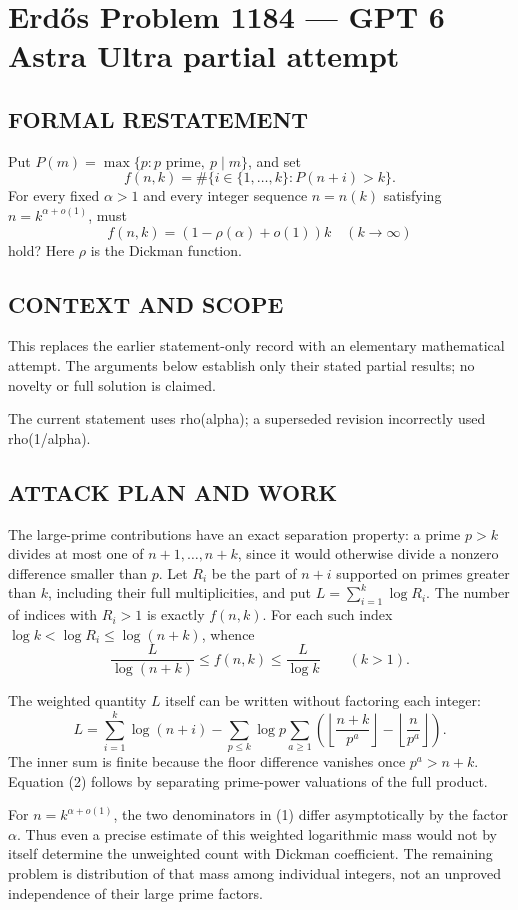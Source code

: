 \section*{Erd\H{o}s Problem 1184 --- GPT 6 Astra Ultra partial attempt}


\subsection*{FORMAL RESTATEMENT}
Put $P(m)=\max\{p:p\text{ prime},\ p\mid m\}$, and set
\[f(n,k)=\#\{i\in\{1,\ldots,k\}:P(n+i)>k\}.\]
For every fixed $\alpha>1$ and every integer sequence $n=n(k)$ satisfying $n=k^{\alpha+o(1)}$, must
\[f(n,k)=(1-\rho(\alpha)+o(1))k\quad(k\to\infty)\]
hold? Here $\rho$ is the Dickman function.

\subsection*{CONTEXT AND SCOPE}
This replaces the earlier statement-only record with an elementary mathematical attempt. The arguments below establish only their stated partial results; no novelty or full solution is claimed.

The current statement uses rho(alpha); a superseded revision incorrectly used rho(1/alpha).

\subsection*{ATTACK PLAN AND WORK}
The large-prime contributions have an exact separation property: a prime
$p>k$ divides at most one of $n+1,\ldots,n+k$, since it would otherwise divide
a nonzero difference smaller than $p$. Let $R_i$ be the part of $n+i$ supported
on primes greater than $k$, including their full multiplicities, and put
$L=\sum_{i=1}^k\log R_i$. The number of indices with $R_i>1$ is exactly $f(n,k)$.
For each such index $\log k<\log R_i\le\log(n+k)$, whence
\[\frac{L}{\log(n+k)}\le f(n,k)\le\frac{L}{\log k}\qquad(k>1).\tag{1}\]

The weighted quantity $L$ itself can be written without factoring each integer:
\[
L=\sum_{i=1}^k\log(n+i)-
\sum_{p\le k}\log p\sum_{a\ge1}
\left(\left\lfloor\frac{n+k}{p^a}\right\rfloor-
      \left\lfloor\frac n{p^a}\right\rfloor\right).\tag{2}
\]
The inner sum is finite because the floor difference vanishes once $p^a>n+k$.
Equation (2) follows by separating prime-power valuations of the full product.

For $n=k^{\alpha+o(1)}$, the two denominators in (1) differ asymptotically by
the factor $\alpha$. Thus even a precise estimate of this weighted logarithmic
mass would not by itself determine the unweighted count with Dickman coefficient.
The remaining problem is distribution of that mass among individual integers,
not an unproved independence of their large prime factors.

